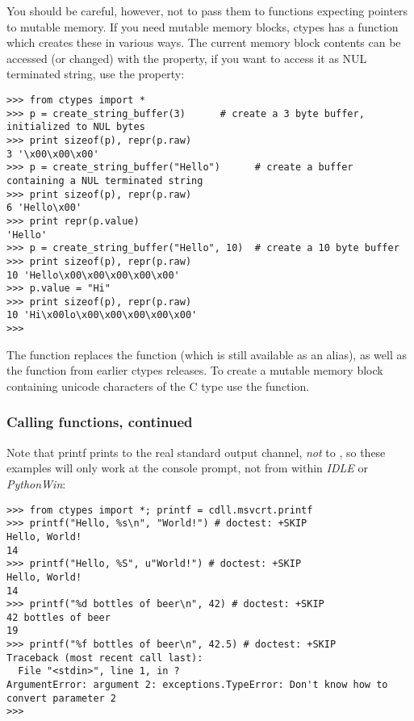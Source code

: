 You should be careful, however, not to pass them to functions
expecting pointers to mutable memory. If you need mutable memory
blocks, ctypes has a  function which creates
these in various ways.  The current memory block contents can be
accessed (or changed) with the  property, if you want to access
it as NUL terminated string, use the  property:
\begin{verbatim}
>>> from ctypes import *
>>> p = create_string_buffer(3)      # create a 3 byte buffer, initialized to NUL bytes
>>> print sizeof(p), repr(p.raw)
3 '\x00\x00\x00'
>>> p = create_string_buffer("Hello")      # create a buffer containing a NUL terminated string
>>> print sizeof(p), repr(p.raw)
6 'Hello\x00'
>>> print repr(p.value)
'Hello'
>>> p = create_string_buffer("Hello", 10)  # create a 10 byte buffer
>>> print sizeof(p), repr(p.raw)
10 'Hello\x00\x00\x00\x00\x00'
>>> p.value = "Hi"
>>> print sizeof(p), repr(p.raw)
10 'Hi\x00lo\x00\x00\x00\x00\x00'
>>>
\end{verbatim}

The  function replaces the 
function (which is still available as an alias), as well as the
 function from earlier ctypes releases.  To create a
mutable memory block containing unicode characters of the C type
 use the  function.


\subsubsection{Calling functions, continued\label{ctypes-calling-functions-continued}}

Note that printf prints to the real standard output channel, \emph{not} to
, so these examples will only work at the console
prompt, not from within \emph{IDLE} or \emph{PythonWin}:
\begin{verbatim}
>>> from ctypes import *; printf = cdll.msvcrt.printf
>>> printf("Hello, %s\n", "World!") # doctest: +SKIP
Hello, World!
14
>>> printf("Hello, %S", u"World!") # doctest: +SKIP
Hello, World!
14
>>> printf("%d bottles of beer\n", 42) # doctest: +SKIP
42 bottles of beer
19
>>> printf("%f bottles of beer\n", 42.5) # doctest: +SKIP
Traceback (most recent call last):
  File "<stdin>", line 1, in ?
ArgumentError: argument 2: exceptions.TypeError: Don't know how to convert parameter 2
>>>
\end{verbatim}

